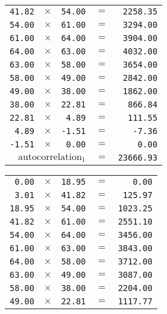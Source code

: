 {\begin{multicols}{2}
\begin{tabular}{rrrrr}
  \texttt{41.82} & $\times$ & \texttt{54.00} & $=$ & \texttt{2258.35} \\
  \texttt{54.00} & $\times$ & \texttt{61.00} & $=$ & \texttt{3294.00} \\
  \texttt{61.00} & $\times$ & \texttt{64.00} & $=$ & \texttt{3904.00} \\
  \texttt{64.00} & $\times$ & \texttt{63.00} & $=$ & \texttt{4032.00} \\
  \texttt{63.00} & $\times$ & \texttt{58.00} & $=$ & \texttt{3654.00} \\
  \texttt{58.00} & $\times$ & \texttt{49.00} & $=$ & \texttt{2842.00} \\
  \texttt{49.00} & $\times$ & \texttt{38.00} & $=$ & \texttt{1862.00} \\
  \texttt{38.00} & $\times$ & \texttt{22.81} & $=$ & \texttt{866.84} \\
  \texttt{22.81} & $\times$ & \texttt{4.89} & $=$ & \texttt{111.55} \\
  \texttt{4.89} & $\times$ & \texttt{-1.51} & $=$ & \texttt{-7.36} \\
  \texttt{-1.51} & $\times$ & \texttt{0.00} & $=$ & \texttt{0.00} \\
  \hline
  \multicolumn{3}{r}{$\text{autocorrelation}_1$} & $=$ & \texttt{23666.93} \\
\end{tabular}
\par
\begin{tabular}{rrrrr}
  \texttt{0.00} & $\times$ & \texttt{18.95} & $=$ & \texttt{0.00} \\
  \texttt{3.01} & $\times$ & \texttt{41.82} & $=$ & \texttt{125.97} \\
  \texttt{18.95} & $\times$ & \texttt{54.00} & $=$ & \texttt{1023.25} \\
  \texttt{41.82} & $\times$ & \texttt{61.00} & $=$ & \texttt{2551.10} \\
  \texttt{54.00} & $\times$ & \texttt{64.00} & $=$ & \texttt{3456.00} \\
  \texttt{61.00} & $\times$ & \texttt{63.00} & $=$ & \texttt{3843.00} \\
  \texttt{64.00} & $\times$ & \texttt{58.00} & $=$ & \texttt{3712.00} \\
  \texttt{63.00} & $\times$ & \texttt{49.00} & $=$ & \texttt{3087.00} \\
  \texttt{58.00} & $\times$ & \texttt{38.00} & $=$ & \texttt{2204.00} \\
  \texttt{49.00} & $\times$ & \texttt{22.81} & $=$ & \texttt{1117.77} \\

\end{tabular}
\end{multicols}}
